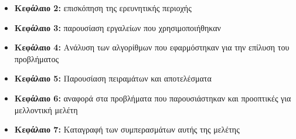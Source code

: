 \begin{itemize}
	\item \textbf{Κεφάλαιο 2:} επισκόπηση της ερευνητικής περιοχής 
	\item \textbf{Κεφάλαιο 3:} παρουσίαση εργαλείων που χρησιμοποιήθηκαν
	\item \textbf{Κεφάλαιο 4:} Ανάλυση των αλγορίθμων που εφαρμόστηκαν για την επίλυση του προβλήματος 
	\item \textbf{Κεφάλαιο 5:} Παρουσίαση πειραμάτων και αποτελέσματα 	
	\item \textbf{Κεφάλαιο 6:} αναφορά στα προβλήματα που παρουσιάστηκαν και προοπτικές για μελλοντική μελέτη
	\item \textbf{Κεφάλαιο 7:} Καταγραφή των συμπερασμάτων αυτής της μελέτης
\end{itemize}

\newpage
